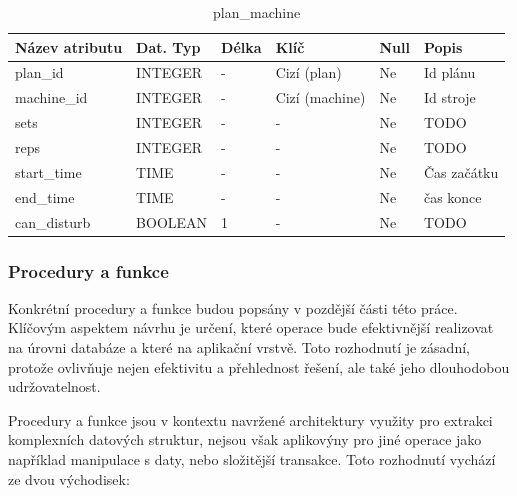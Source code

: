 \begin{table}[h!]
	\caption{plan\_machine}
    \label{tab:dat-dictionary-plan-machine}
	\begin{tabular}{|p{3.5cm}|p{2cm}|p{1cm}|p{2.5cm}|p{.75cm}|p{3.75cm}|}
		\hline
        \textbf{Název atributu} & \textbf{Dat. Typ} & \textbf{Délka} & \textbf{Klíč} & \textbf{Null} & \textbf{Popis} \\
        \hline
            plan\_id        & INTEGER   &  -    & Cizí (plan)       & Ne & Id plánu \\
        \hline
            machine\_id     & INTEGER   &  -    & Cizí (machine)       & Ne & Id stroje \\
        \hline
            sets                & INTEGER   &  -   & -                 & Ne & TODO \\
        \hline
            reps                & INTEGER   &  -    & -                 & Ne &  TODO \\
            start\_time     & TIME      &  -    & -                 & Ne & Čas začátku \\
        \hline
            end\_time       & TIME      &  -    & -                 & Ne & čas konce \\
        \hline
            can\_disturb          & BOOLEAN   &  1    & -                 & Ne & TODO \\
        \hline
	\end{tabular}
\end{table}

\subsubsection{Procedury a funkce}
Konkrétní procedury a funkce budou popsány v pozdější části této práce. Klíčovým aspektem návrhu je určení, které operace bude efektivnější realizovat na úrovni databáze a které na aplikační vrstvě. Toto rozhodnutí je zásadní, protože ovlivňuje nejen efektivitu a přehlednost řešení, ale také jeho dlouhodobou udržovatelnost.

Procedury a funkce jsou v kontextu navržené architektury využity pro extrakci komplexních datových struktur, nejsou však aplikovýny pro jiné operace jako například manipulace s daty, nebo složitější transakce. Toto rozhodnutí vychází ze dvou východisek:

